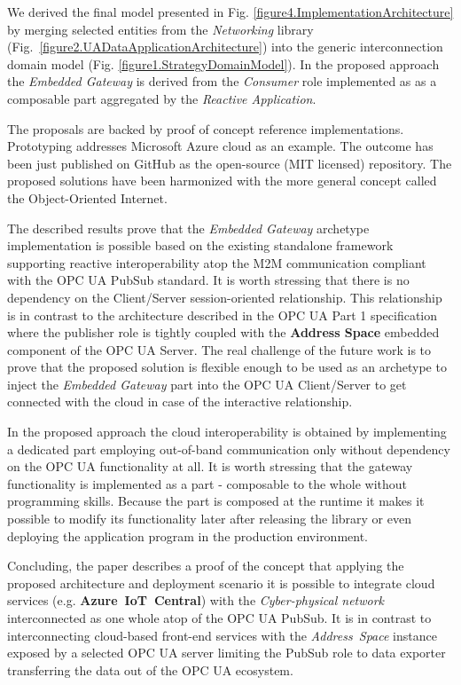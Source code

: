 \documentclass[runningheads]{llncs}
\begin{document}
We derived the final model presented in Fig. \ref{figure4.ImplementationArchitecture} by merging selected entities from the \emph{Networking} library (Fig.~\ref{figure2.UADataApplicationArchitecture}) into the generic interconnection domain model (Fig. \ref{figure1.StrategyDomainModel}). In the proposed approach the \emph{Embedded Gateway} is derived from the \emph{Consumer} role implemented as as a composable part aggregated by the \emph{Reactive Application}.

The proposals are backed by proof of concept reference implementations. Prototyping addresses Microsoft Azure cloud as an example. The outcome has been just published on GitHub as the open-source (MIT licensed) repository. The proposed solutions have been harmonized with the more general concept called the Object-Oriented Internet.

The described results prove that the \emph{Embedded Gateway} archetype implementation is possible based on the existing standalone framework supporting reactive interoperability atop the M2M communication compliant with the OPC UA PubSub standard. It is worth stressing that there is no dependency on the Client/Server session-oriented relationship. This relationship is in contrast to the architecture described in the OPC UA Part 1 \cite{OPCUAPart1} specification where the publisher role is tightly coupled with the \textbf{Address Space} \cite{RefWorks:doc:5ac86c97e4b009947bbb8728} embedded component of the OPC UA Server. The real challenge of the future work is to prove that the proposed solution is flexible enough to be used as an archetype to inject the \emph{Embedded Gateway} part into the OPC UA Client/Server to get connected with the cloud in case of the interactive relationship.

In the proposed approach the cloud interoperability is obtained by implementing a dedicated part employing out-of-band communication only without dependency on the OPC UA functionality at all. It is worth stressing that the gateway functionality is implemented as a part - composable to the whole without programming skills. Because the part is composed at the runtime it makes it possible to modify its functionality later after releasing the library or even deploying the application program in the production environment.

Concluding, the paper describes a proof of the concept that applying the proposed architecture and deployment scenario it is possible to integrate cloud services (e.g. \textbf{Azure\ IoT\ Central}) with the \emph{Cyber-physical network} interconnected as one whole atop of the OPC UA PubSub. It is in contrast to interconnecting cloud-based front-end services with the \emph{ Address\ Space} instance exposed by a selected OPC UA server limiting the PubSub role to data exporter transferring the data out of the OPC UA ecosystem.



\end{document}
